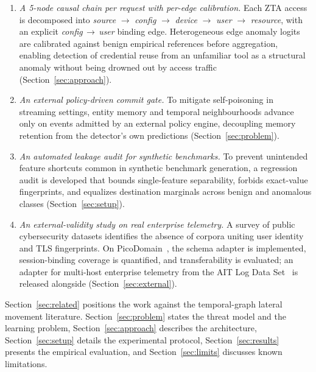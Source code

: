 \begin{enumerate}
  \item \textit{A 5-node causal chain per request with per-edge calibration.} Each ZTA access
  is decomposed into \textit{source} $\rightarrow$ \textit{config} $\rightarrow$ \textit{device}
  $\rightarrow$ \textit{user} $\rightarrow$ \textit{resource}, with an explicit
  \textit{config}\,$\rightarrow$\,\textit{user} binding edge. Heterogeneous edge anomaly logits
  are calibrated against benign empirical references before aggregation, enabling detection of
  credential reuse from an unfamiliar tool as a structural anomaly without being drowned out by
  access traffic (Section~\ref{sec:approach}).

  \item \textit{An external policy-driven commit gate.} To mitigate self-poisoning
  in streaming settings, entity memory and temporal neighbourhoods advance only on
  events admitted by an external policy engine, decoupling memory retention from the
  detector's own predictions (Section~\ref{sec:problem}).

  \item \textit{An automated leakage audit for synthetic benchmarks.} To prevent
  unintended feature shortcuts common in synthetic benchmark generation, a regression
  audit is developed that bounds single-feature separability, forbids exact-value
  fingerprints, and equalizes destination marginals across benign and anomalous classes
  (Section~\ref{sec:setup}).

  \item \textit{An external-validity study on real enterprise telemetry.} A survey of
  public cybersecurity datasets identifies the absence of corpora uniting user identity
  and TLS fingerprints. On PicoDomain~\cite{picodomain}, the schema adapter is implemented,
  session-binding coverage is quantified, and transferability is evaluated; an adapter for
  multi-host enterprise telemetry from the AIT Log Data Set~\cite{ait} is released alongside
  (Section~\ref{sec:external}).
\end{enumerate}

Section~\ref{sec:related} positions the work against the temporal-graph lateral
movement literature. Section~\ref{sec:problem} states the threat model and the
learning problem, Section~\ref{sec:approach} describes the architecture,
Section~\ref{sec:setup} details the experimental protocol, Section~\ref{sec:results} presents
the empirical evaluation, and Section~\ref{sec:limits} discusses known limitations.
